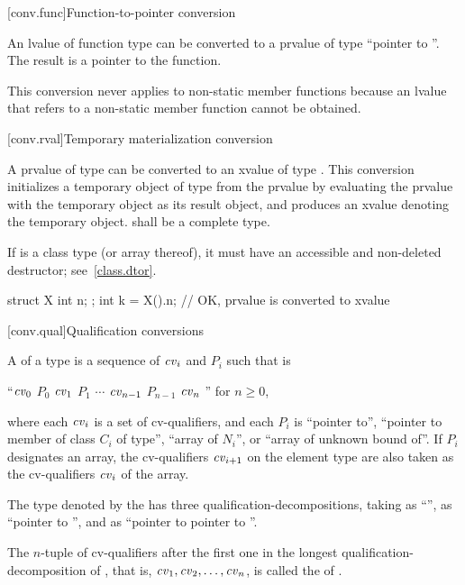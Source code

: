 [conv.func]{Function-to-pointer conversion}

\pnum
{}%
An lvalue of function type  can be converted to a prvalue of
type ``pointer to ''. The result is a pointer to the
function.
\begin{footnote}
This conversion never applies to non-static member functions because an
lvalue that refers to a non-static member function cannot be obtained.
\end{footnote}

[conv.rval]{Temporary materialization conversion}
%

\pnum
A prvalue of type  can be converted to an xvalue of type .
This conversion initializes a temporary object of type  from the prvalue
by evaluating the prvalue with the temporary object as its result object,
and produces an xvalue denoting the temporary object.
 shall be a complete type.
\begin{note}
If  is a class type (or array thereof),
it must have an accessible and non-deleted destructor;
see~\ref{class.dtor}.
\end{note}
\begin{example}
\begin{codeblock}
struct X { int n; };
int k = X().n;      // OK,  prvalue is converted to xvalue
\end{codeblock}
\end{example}

[conv.qual]{Qualification conversions}

%
\pnum
A  of a type 
is a sequence of
$\cv{}_i$ and $P_i$
such that  is
\begin{indented}
``$\cv{}_0$ $P_0$ $\cv{}_1$ $P_1$ $\cdots$ $\cv{}_{n-1}$ $P_{n-1}$ $\cv{}_n$ '' for $n \geq 0$,
\end{indented}
where
each $\cv{}_i$ is a set of cv-qualifiers, and
each $P_i$ is
``pointer to'',
``pointer to member of class $C_i$ of type'',
``array of $N_i$'', or
``array of unknown bound of''.
If $P_i$ designates an array,
the cv-qualifiers $\cv{}_{i+1}$ on the element type are also taken as
the cv-qualifiers $\cv{}_i$ of the array.
\begin{example}
The type denoted by the  
has three qualification-decompositions,
taking 
as ``'',
as ``pointer to '', and
as ``pointer to pointer to ''.
\end{example}
The $n$-tuple of cv-qualifiers after the first one
in the longest qualification-decomposition of , that is,
$\cv{}_1, \cv{}_2, \dotsc, \cv{}_n$, is called the
 of .

